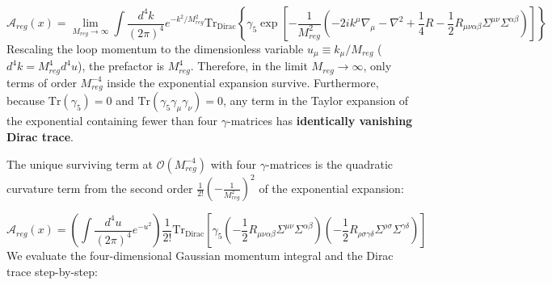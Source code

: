 \documentclass[aps,prd,onecolumn,superscriptaddress,nofootinbib,longbibliography,10pt]{revtex4-2}
\begin{document}
  \[ \mathcal{A}_{reg}(x) = \lim_{M_{reg}\to\infty}\int\frac{d^4k}{(2\pi)^4}e^{-k^2/M_{reg}^2}\text{Tr}_{\text{Dirac}}\left\{ \gamma_5\exp\left[ -\frac{1}{M_{reg}^2}\left(-2ik^\mu\nabla_\mu - \nabla^2 + \frac{1}{4}R - \frac{1}{2}R_{\mu\nu\alpha\beta}\Sigma^{\mu\nu}\Sigma^{\alpha\beta}\right) \right] \right\} \]
  Rescaling the loop momentum to the dimensionless variable \(u_\mu \equiv k_\mu/M_{reg}\) (\(d^4k = M_{reg}^4 d^4u\)), the prefactor is \(M_{reg}^4\). Therefore, in the limit \(M_{reg} \to \infty\), only terms of order \(M_{reg}^{-4}\) inside the exponential expansion survive. Furthermore, because \(\text{Tr}(\gamma_5) = 0\) and \(\text{Tr}(\gamma_5\gamma_\mu\gamma_\nu) = 0\), any term in the Taylor expansion of the exponential containing fewer than four \(\gamma\)-matrices has \textbf{identically vanishing Dirac trace}.


  The unique surviving term at \(\mathcal{O}(M_{reg}^{-4})\) with four \(\gamma\)-matrices is the quadratic curvature term from the second order \(\frac{1}{2!}\left(-\frac{1}{M_{reg}^2}\right)^2\) of the exponential expansion:


  \[ \mathcal{A}_{reg}(x) = \left(\int\frac{d^4u}{(2\pi)^4}e^{-u^2}\right)\frac{1}{2!}\text{Tr}_{\text{Dirac}}\left[ \gamma_5\left(-\frac{1}{2}R_{\mu\nu\alpha\beta}\Sigma^{\mu\nu}\Sigma^{\alpha\beta}\right)\left(-\frac{1}{2}R_{\rho\sigma\gamma\delta}\Sigma^{\rho\sigma}\Sigma^{\gamma\delta}\right) \right] \]
  We evaluate the four-dimensional Gaussian momentum integral and the Dirac trace step-by-step:
\end{document}
